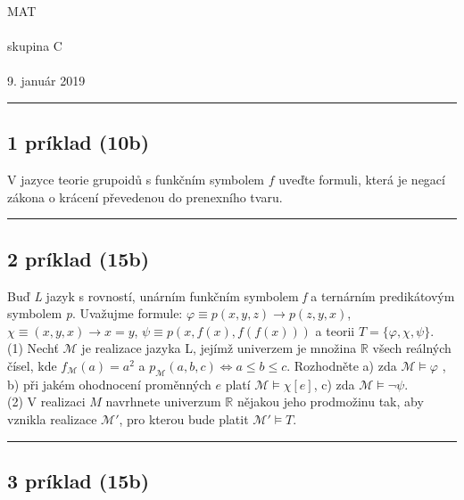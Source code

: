 \documentclass[11pt,a4paper]{article}
\begin{document}
\begin{center}
  \begin{bf}
    \Huge{MAT}\\[-0.5em]
    {\normalsize{}}\\[0.5em]

    \Large{skupina C}\\[-0.25em]
    {\normalsize{}}\\[1em]

    9. január 2019
  \end{bf}
\end{center}

\hrule

\subsection*{1 príklad (10b)}

  V jazyce teorie grupoidů s funkčním symbolem $f$ uveďte formuli, která je negací zákona o krácení převedenou do prenexního tvaru.\\

  \hrule

\subsection*{2 príklad (15b)}

  Buď \emph{L} jazyk s rovností, unárním funkčním symbolem \emph{f} a ternárním predikátovým symbolem \emph{p}. Uvažujme formule: $\varphi \equiv p(x,y,z) \rightarrow p(z,y,x)$, $\chi \equiv (x,y,x) \rightarrow x = y$, $\psi \equiv p(x, f(x), f(f(x)))$ a teorii $T = \lbrace \varphi, \chi, \psi \rbrace$.\\[2mm]
  (1) Nechť $\mathcal{M}$ je realizace jazyka L, jejímž univerzem je množina $\mathbb{R}$ všech reálných čísel, kde $f_{\mathcal{M}}(a) = a^2$ a $p_\mathcal{M}(a,b,c) \Leftrightarrow a \leq b \leq c$. Rozhodněte a) zda $\mathcal{M} \models \varphi$ , b) při jakém ohodnocení proměnných $e$ platí $\mathcal{M} \models \chi[e]$, c) zda $\mathcal{M} \models \neg \psi$.\\[2mm]
  (2) V realizaci $M$ navrhnete univerzum $\mathbb{R}$ nějakou jeho prodmožinu tak, aby vznikla realizace $\mathcal{M}'$, pro kterou bude platit $\mathcal{M}' \models T$.\\

  \hrule

\subsection*{3 príklad (15b)}
\end{document}
